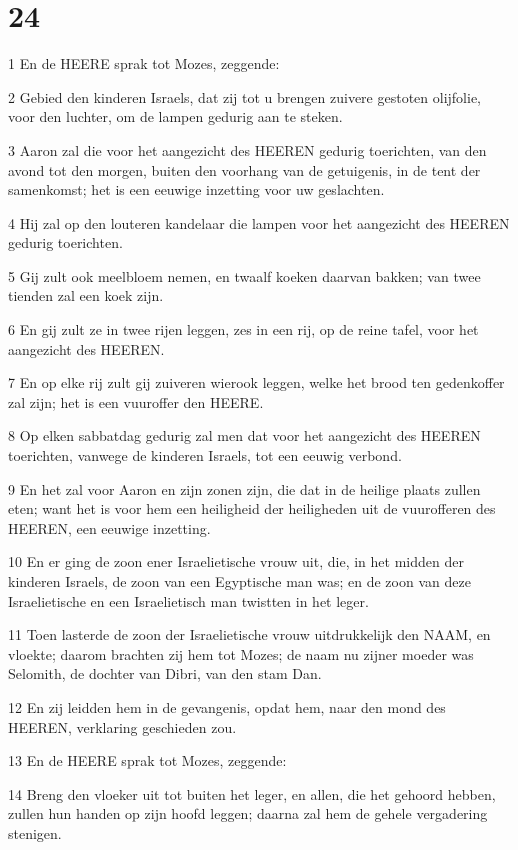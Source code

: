 \chapter{24}

\par 1 En de HEERE sprak tot Mozes, zeggende:
\par 2 Gebied den kinderen Israels, dat zij tot u brengen zuivere gestoten olijfolie, voor den luchter, om de lampen gedurig aan te steken.
\par 3 Aaron zal die voor het aangezicht des HEEREN gedurig toerichten, van den avond tot den morgen, buiten den voorhang van de getuigenis, in de tent der samenkomst; het is een eeuwige inzetting voor uw geslachten.
\par 4 Hij zal op den louteren kandelaar die lampen voor het aangezicht des HEEREN gedurig toerichten.
\par 5 Gij zult ook meelbloem nemen, en twaalf koeken daarvan bakken; van twee tienden zal een koek zijn.
\par 6 En gij zult ze in twee rijen leggen, zes in een rij, op de reine tafel, voor het aangezicht des HEEREN.
\par 7 En op elke rij zult gij zuiveren wierook leggen, welke het brood ten gedenkoffer zal zijn; het is een vuuroffer den HEERE.
\par 8 Op elken sabbatdag gedurig zal men dat voor het aangezicht des HEEREN toerichten, vanwege de kinderen Israels, tot een eeuwig verbond.
\par 9 En het zal voor Aaron en zijn zonen zijn, die dat in de heilige plaats zullen eten; want het is voor hem een heiligheid der heiligheden uit de vuurofferen des HEEREN, een eeuwige inzetting.
\par 10 En er ging de zoon ener Israelietische vrouw uit, die, in het midden der kinderen Israels, de zoon van een Egyptische man was; en de zoon van deze Israelietische en een Israelietisch man twistten in het leger.
\par 11 Toen lasterde de zoon der Israelietische vrouw uitdrukkelijk den NAAM, en vloekte; daarom brachten zij hem tot Mozes; de naam nu zijner moeder was Selomith, de dochter van Dibri, van den stam Dan.
\par 12 En zij leidden hem in de gevangenis, opdat hem, naar den mond des HEEREN, verklaring geschieden zou.
\par 13 En de HEERE sprak tot Mozes, zeggende:
\par 14 Breng den vloeker uit tot buiten het leger, en allen, die het gehoord hebben, zullen hun handen op zijn hoofd leggen; daarna zal hem de gehele vergadering stenigen.
